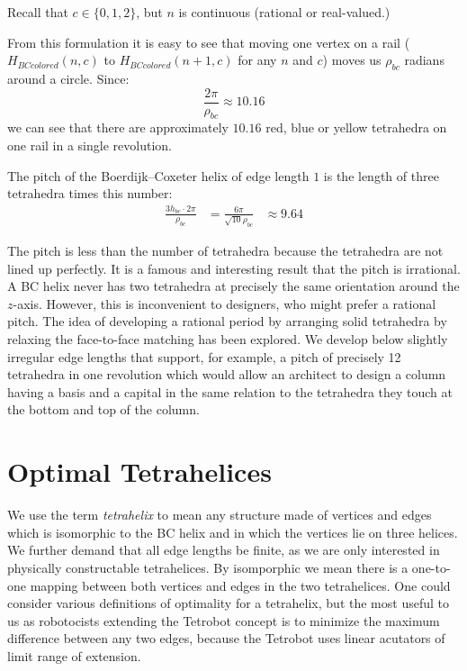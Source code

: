 \documentclass[11pt]{article}
\begin{document}
Recall that $c \in \{0,1,2\}$, but $n$ is continuous (rational or real-valued.)

From this formulation it is easy to see that moving one vertex on a rail
($H_{BCcolored}(n,c)$ to $H_{BCcolored}(n+1,c)$ for any $n$ and $c$)
moves us $\rho_{bc}$ radians around a circle. Since:
\[ \frac{2 \pi}{\rho_{bc}} \approx 10.16
\]
we can see that there are approximately $10.16$ red, blue or yellow tetrahedra on one rail in a single revolution.

The pitch of the Boerdijk--Coxeter helix of edge length $1$ is the length of three tetrahedra times this number:
\begin{align*}
   \frac{3 h_{bc}\cdot  2 \pi }{\rho_{bc}} 
  &= \frac{6 \pi}{\sqrt{10}\rho_{bc}} 
  &\approx 9.64 
\end{align*}


The pitch is less than the number of tetrahedra because the tetrahedra
are not lined up perfectly.  It is a famous and interesting result
that the pitch is irrational. A BC helix never has two tetrahedra at
precisely the same orientation around the $z$-axis. However, this is
inconvenient to designers, who might prefer a rational pitch.
The idea of developing a rational period by arranging solid tetrahedra by relaxing the face-to-face matching
has been explored\cite{sadler2013periodic}. 
We develop below slightly irregular edge lengths that support, for example, a pitch of precisely 12
tetrahedra in one revolution which would allow an architect to design a
column having a basis and a capital in the same relation to the
tetrahedra they touch at the bottom and top of the column.


\section{Optimal Tetrahelices}

We use the term \emph{tetrahelix} to mean any structure made of
vertices and edges which is isomorphic to the BC helix and in which the
vertices lie on three helices. We further demand that all edge lengths
be finite, as we are only interested in physically constructable tetrahelices.
By isomporphic we mean there is a one-to-one mapping between both
vertices and edges in the two tetrahelices.
One could consider various definitions of optimality for a
tetrahelix, but the most useful to us as robotocists extending the Tetrobot concept is to minimize the
maximum difference between any two edges, because the Tetrobot uses linear acutators of limit range of extension.
\end{document}
